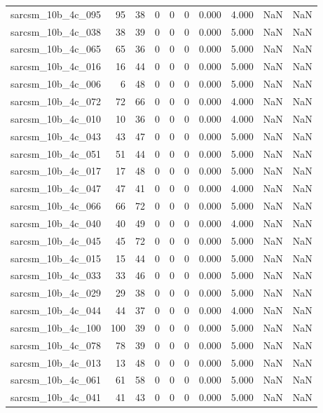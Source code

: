 \documentclass{article}
\begin{document}
\begin{longtable}{lrrrrrrrrr}
sarcsm\_10b\_4c\_095 & 95 & 38 & 0 & 0 & 0 & 0.000 & 4.000 & NaN & NaN \\
sarcsm\_10b\_4c\_038 & 38 & 39 & 0 & 0 & 0 & 0.000 & 5.000 & NaN & NaN \\
sarcsm\_10b\_4c\_065 & 65 & 36 & 0 & 0 & 0 & 0.000 & 5.000 & NaN & NaN \\
sarcsm\_10b\_4c\_016 & 16 & 44 & 0 & 0 & 0 & 0.000 & 5.000 & NaN & NaN \\
sarcsm\_10b\_4c\_006 & 6 & 48 & 0 & 0 & 0 & 0.000 & 5.000 & NaN & NaN \\
sarcsm\_10b\_4c\_072 & 72 & 66 & 0 & 0 & 0 & 0.000 & 4.000 & NaN & NaN \\
sarcsm\_10b\_4c\_010 & 10 & 36 & 0 & 0 & 0 & 0.000 & 4.000 & NaN & NaN \\
sarcsm\_10b\_4c\_043 & 43 & 47 & 0 & 0 & 0 & 0.000 & 5.000 & NaN & NaN \\
sarcsm\_10b\_4c\_051 & 51 & 44 & 0 & 0 & 0 & 0.000 & 5.000 & NaN & NaN \\
sarcsm\_10b\_4c\_017 & 17 & 48 & 0 & 0 & 0 & 0.000 & 5.000 & NaN & NaN \\
sarcsm\_10b\_4c\_047 & 47 & 41 & 0 & 0 & 0 & 0.000 & 4.000 & NaN & NaN \\
sarcsm\_10b\_4c\_066 & 66 & 72 & 0 & 0 & 0 & 0.000 & 5.000 & NaN & NaN \\
sarcsm\_10b\_4c\_040 & 40 & 49 & 0 & 0 & 0 & 0.000 & 4.000 & NaN & NaN \\
sarcsm\_10b\_4c\_045 & 45 & 72 & 0 & 0 & 0 & 0.000 & 5.000 & NaN & NaN \\
sarcsm\_10b\_4c\_015 & 15 & 44 & 0 & 0 & 0 & 0.000 & 5.000 & NaN & NaN \\
sarcsm\_10b\_4c\_033 & 33 & 46 & 0 & 0 & 0 & 0.000 & 5.000 & NaN & NaN \\
sarcsm\_10b\_4c\_029 & 29 & 38 & 0 & 0 & 0 & 0.000 & 5.000 & NaN & NaN \\
sarcsm\_10b\_4c\_044 & 44 & 37 & 0 & 0 & 0 & 0.000 & 4.000 & NaN & NaN \\
sarcsm\_10b\_4c\_100 & 100 & 39 & 0 & 0 & 0 & 0.000 & 5.000 & NaN & NaN \\
sarcsm\_10b\_4c\_078 & 78 & 39 & 0 & 0 & 0 & 0.000 & 5.000 & NaN & NaN \\
sarcsm\_10b\_4c\_013 & 13 & 48 & 0 & 0 & 0 & 0.000 & 5.000 & NaN & NaN \\
sarcsm\_10b\_4c\_061 & 61 & 58 & 0 & 0 & 0 & 0.000 & 5.000 & NaN & NaN \\
sarcsm\_10b\_4c\_041 & 41 & 43 & 0 & 0 & 0 & 0.000 & 5.000 & NaN & NaN \\

\end{longtable}
\end{document}
